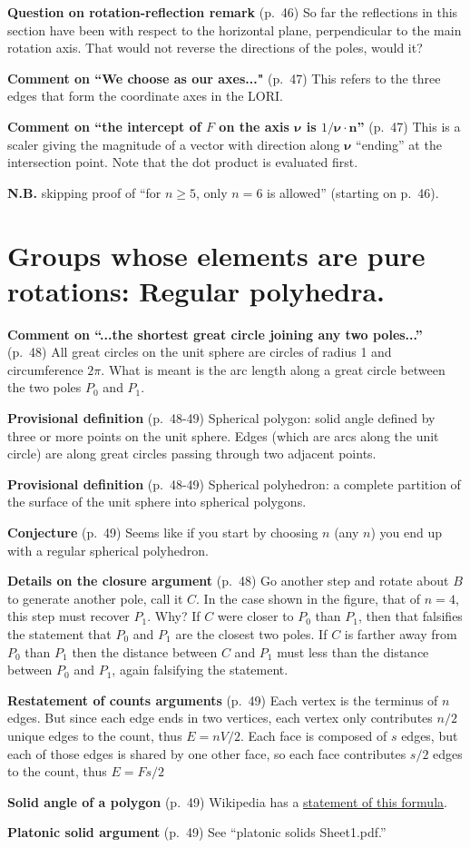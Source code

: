 {\bf Question on rotation-reflection remark} (p.\ 46) So far the
reflections in this section have been with respect to the horizontal
plane, perpendicular to the main rotation axis. That would not reverse
the directions of the poles, would it?

{\bf Comment on ``We choose as our axes..."} (p.\ 47) This refers to
the three edges that form the coordinate axes in the LORI.

{\bf Comment on ``the intercept of $F$ on the axis $\boldsymbol{\nu}$
  is $1/\boldsymbol{\nu}\cdot\mathbf{n}$''} (p.\ 47) This is a scaler
giving the magnitude of a vector with direction along
$\boldsymbol{\nu}$ ``ending'' at the intersection point. Note that the
dot product is evaluated first.

{\bf N.B.} skipping proof of ``for $n\ge 5$, only $n=6$ is allowed''
(starting on p.\ 46).

\section{Groups whose elements are pure rotations: Regular polyhedra.}

{\bf Comment on ``...the shortest great circle joining any two
  poles...''} (p.\ 48) All great circles on the unit sphere are
circles of radius 1 and circumference $2\pi$. What is meant is the arc
length along a great circle between the two poles $P_0$ and $P_1$.

{\bf Provisional definition} (p.\ 48-49) Spherical polygon: solid
angle defined by three or more points on the unit sphere. Edges (which
are arcs along the unit circle) are along great circles passing
through two adjacent points.

{\bf Provisional definition} (p.\ 48-49) Spherical polyhedron: a
complete partition of the surface of the unit sphere into spherical
polygons.

{\bf Conjecture} (p.\ 49) Seems like if you start by choosing $n$ (any
$n$) you end up with a regular spherical polyhedron.

{\bf Details on the closure argument} (p.\ 48) Go another step and rotate about $B$ to generate another pole, call it $C$. In the case shown in the figure, that of $n=4$, this step must recover $P_1$. Why? If $C$ were closer to $P_0$ than $P_1$, then that falsifies the statement that $P_0$ and $P_1$ are the closest two poles. If $C$ is farther away from $P_0$ than $P_1$ then the distance between $C$ and $P_1$ must less than the distance between $P_0$ and $P_1$, again falsifying the statement.

{\bf Restatement of counts arguments} (p.\ 49) Each vertex is the
terminus of $n$ edges. But since each edge ends in two vertices, each
vertex only contributes $n/2$ unique edges to the count, thus
$E=nV/2$. Each face is composed of $s$ edges, but each of those edges
is shared by one other face, so each face contributes $s/2$ edges to
the count, thus $E=Fs/2$

{\bf Solid angle of a polygon} (p.\ 49) Wikipedia has a
\href{https://en.wikipedia.org/wiki/Spherical_trigonometry#Area_and_spherical_excess}{statement
  of this formula}.

{\bf Platonic solid argument} (p.\ 49) See ``platonic solids Sheet1.pdf.''
